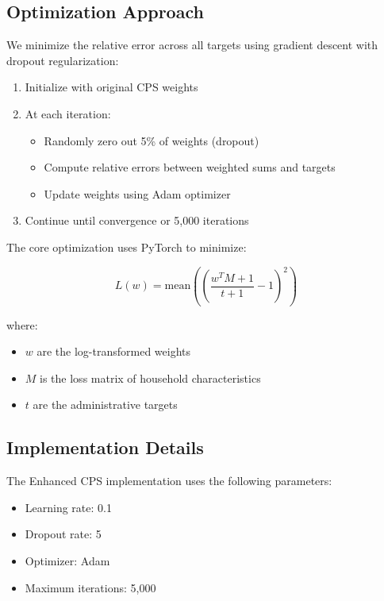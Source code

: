 \subsection{Optimization Approach}

We minimize the relative error across all targets using gradient descent with dropout regularization:

\begin{enumerate}
    \item Initialize with original CPS weights
    \item At each iteration:
    \begin{itemize}
        \item Randomly zero out 5\% of weights (dropout)
        \item Compute relative errors between weighted sums and targets
        \item Update weights using Adam optimizer
    \end{itemize}
    \item Continue until convergence or 5,000 iterations
\end{enumerate}

The core optimization uses PyTorch to minimize:

\[
L(w) = \text{mean}\left(\left(\frac{w^T M + 1}{t + 1} - 1\right)^2\right)
\]

where:
\begin{itemize}
    \item $w$ are the log-transformed weights
    \item $M$ is the loss matrix of household characteristics
    \item $t$ are the administrative targets
\end{itemize}

\subsection{Implementation Details}

The Enhanced CPS implementation uses the following parameters:
\begin{itemize}
\item Learning rate: 0.1
\item Dropout rate: 5%
\item Optimizer: Adam
\item Maximum iterations: 5,000
\end{itemize}


